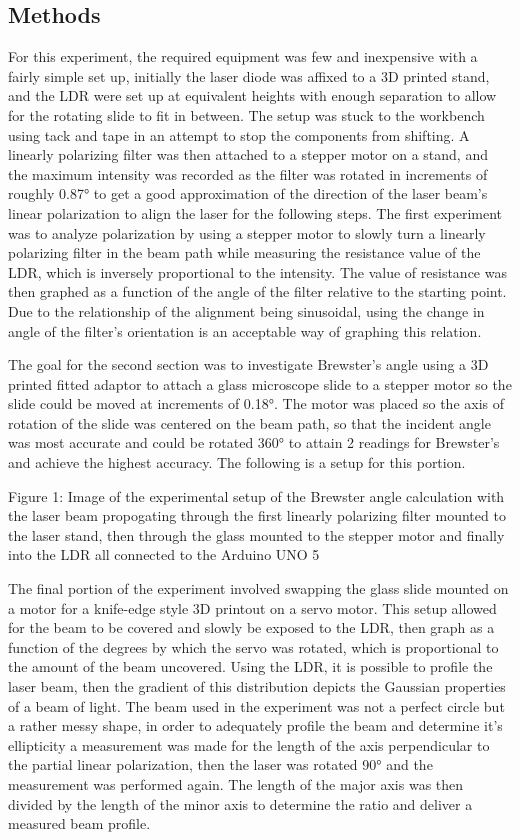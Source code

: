 \documentclass[11pt]{article}
\begin{document}
    \hypertarget{methods}{%
\subsection{Methods}\label{methods}}

    For this experiment, the required equipment was few and inexpensive with
a fairly simple set up, initially the laser diode was affixed to a 3D
printed stand, and the LDR were set up at equivalent heights with enough
separation to allow for the rotating slide to fit in between. The setup
was stuck to the workbench using tack and tape in an attempt to stop the
components from shifting. A linearly polarizing filter was then attached
to a stepper motor on a stand, and the maximum intensity was recorded as
the filter was rotated in increments of roughly 0.87° to get a good
approximation of the direction of the laser beam's linear polarization
to align the laser for the following steps. The first experiment was to
analyze polarization by using a stepper motor to slowly turn a linearly
polarizing filter in the beam path while measuring the resistance value
of the LDR, which is inversely proportional to the intensity. The value
of resistance was then graphed as a function of the angle of the filter
relative to the starting point. Due to the relationship of the alignment
being sinusoidal, using the change in angle of the filter's orientation
is an acceptable way of graphing this relation.

The goal for the second section was to investigate Brewster's angle
using a 3D printed fitted adaptor to attach a glass microscope slide to
a stepper motor so the slide could be moved at increments of 0.18°. The
motor was placed so the axis of rotation of the slide was centered on
the beam path, so that the incident angle was most accurate and could be
rotated 360° to attain 2 readings for Brewster's and achieve the highest
accuracy. The following is a setup for this portion.

    Figure 1: Image of the experimental setup of the Brewster angle
calculation with the laser beam propogating through the first linearly
polarizing filter mounted to the laser stand, then through the glass
mounted to the stepper motor and finally into the LDR all connected to
the Arduino UNO 5

    The final portion of the experiment involved swapping the glass slide
mounted on a motor for a knife-edge style 3D printout on a servo motor.
This setup allowed for the beam to be covered and slowly be exposed to
the LDR, then graph as a function of the degrees by which the servo was
rotated, which is proportional to the amount of the beam uncovered.
Using the LDR, it is possible to profile the laser beam, then the
gradient of this distribution depicts the Gaussian properties of a beam
of light. The beam used in the experiment was not a perfect circle but a
rather messy shape, in order to adequately profile the beam and
determine it's ellipticity a measurement was made for the length of the
axis perpendicular to the partial linear polarization, then the laser
was rotated 90° and the measurement was performed again. The length of
the major axis was then divided by the length of the minor axis to
determine the ratio and deliver a measured beam profile.
\end{document}
